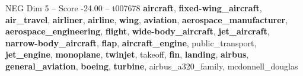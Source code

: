 \begin{textsample}{NEG Dim 5 – Score -24.00 – t007678}  \label{ex:f5_neg_005}
\textbf{aircraft}, \textbf{fixed-wing\_aircraft}, \textbf{air\_travel}, \textbf{airliner}, \textbf{airline}, \textbf{wing}, \textbf{aviation}, \textbf{aerospace\_manufacturer}, \textbf{aerospace\_engineering}, \textbf{flight}, \textbf{wide-body\_aircraft}, \textbf{jet\_aircraft}, \textbf{narrow-body\_aircraft}, \textbf{flap}, \textbf{aircraft\_engine}, public\_transport, \textbf{jet\_engine}, \textbf{monoplane}, \textbf{twinjet}, takeoff, \textbf{fin}, \textbf{landing}, \textbf{airbus}, \textbf{general\_aviation}, \textbf{boeing}, \textbf{turbine}, airbus\_a320\_family, mcdonnell\_douglas

\end{textsample}
